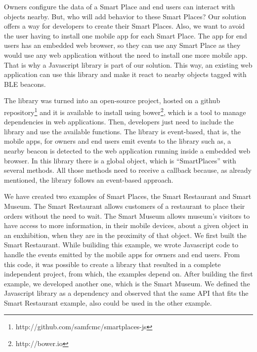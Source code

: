 Owners configure the data of a Smart Place and end users can interact with objects nearby.
But, who will add behavior to these Smart Places?
Our solution offers a way for developers to create their Smart Places.
Also, we want to avoid the user having to install one mobile app for each Smart Place.
The app for end users has an embedded web browser, so they can use any Smart Place as they would use any web application without the need to install one more mobile app.
That is why a Javascript library is part of our solution.
This way, an existing web application can use this library and make it react to nearby objects tagged with \gls{BLE} beacons.

The library was turned into an open-source project, hosted on a github repository\footnote{http://github.com/samfcmc/smartplaces-js} and it is available to install using bower\footnote{http://bower.io}, which is a tool to manage dependencies in web applications.
Then, developers just need to include the library and use the available functions.
The library is event-based, that is, the mobile apps, for owners and end users emit events to the library such as, a nearby beacon is detected to the web application running inside a embedded web browser.
In this library there is a global object, which is ``SmartPlaces'' with several methods.
All those methods need to receive a callback because, as already mentioned, the library follows an event-based approach.

We have created two examples of Smart Places, the Smart Restaurant and Smart Museum.
The Smart Restaurant allows customers of a restaurant to place their orders without the need to wait.
The Smart Museum allows museum's visitors to have access to more information, in their mobile devices, about a given object in an enxhibition, when they are in the proximity of that object.
We first built the Smart Restaurant.
While builiding this example, we wrote Javascript code to handle the events emitted by the mobile apps for owners and end users.
From this code, it was possible to create a library that resulted in a complete independent project, from which, the examples depend on.
After building the first example, we developed another one, which is the Smart Museum.
We defined the Javascript library as a dependency and observed that the same \gls{API} that fits the Smart Restaurant example, also could be used in the other example.
